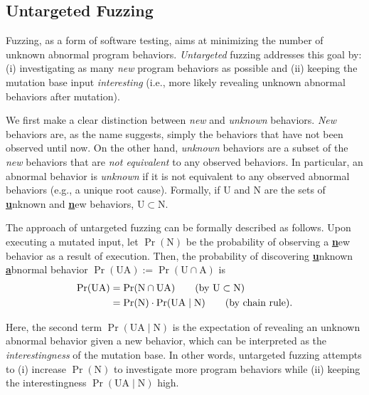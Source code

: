\documentclass[letterpaper,twocolumn,10pt]{article}
\begin{document}
\subsection{Untargeted Fuzzing}
\label{s:fuzz:unfuzz}

Fuzzing, as a form of software testing, aims at minimizing the number of unknown
abnormal program behaviors. \emph{Untargeted} fuzzing addresses this goal by:
(i) investigating as many \emph{new} program behaviors as possible and (ii)
keeping the mutation base input \emph{interesting} (i.e., more likely revealing
unknown abnormal behaviors after mutation).

%
We first make a clear distinction between \emph{new} and \emph{unknown} 
behaviors. \emph{New} behaviors are, as the name suggests, simply the behaviors 
that have not been observed until now. On the other hand, \emph{unknown}
behaviors are a subset of the \emph{new} behaviors that are \emph{not
equivalent} to any observed behaviors. In particular, an abnormal behavior is
\emph{unknown} if it is not equivalent to any observed abnormal behaviors (e.g.,
a unique root cause). Formally, if $\mathrm{U}$ and $\mathrm{N}$ are the sets of
\underline{\textbf{u}}nknown and \underline{\textbf{n}}ew behaviors,
$\mathrm{U} \subset \mathrm{N}$.

%
The approach of untargeted fuzzing can be formally described as follows. Upon
executing a mutated input, let $\Pr(\mathrm{N})$ be the probability of observing a
\underline{\textbf{n}}ew behavior as a result of execution. Then, the
probability of discovering \underline{\textbf{u}}nknown
\underline{\textbf{a}}bnormal behavior $\Pr(\mathrm{UA}) := \Pr(\mathrm{U} \cap
\mathrm{A})$ is
%
\begin{align}
  \Pr(\mathrm{UA}) 
      &= \Pr(\mathrm{N} \cap \mathrm{UA}) \tag{by $\mathrm{U} \subset \mathrm{N}$} \\
      &= \Pr(\mathrm{N}) \cdot \Pr(\mathrm{UA} \mid \mathrm{N}) \tag{by chain rule}. 
\end{align}

Here, the second term $\Pr(\mathrm{UA} \mid \mathrm{N})$ is the expectation of
revealing an unknown abnormal behavior given a new behavior, which can be
interpreted as the \emph{interestingness} of the mutation base. In other words,
untargeted fuzzing attempts to (i) increase $\Pr(\mathrm{N})$ to investigate
more program behaviors while (ii) keeping the interestingness $\Pr(\mathrm{UA}
\mid \mathrm{N})$ high.
%
\end{document}
